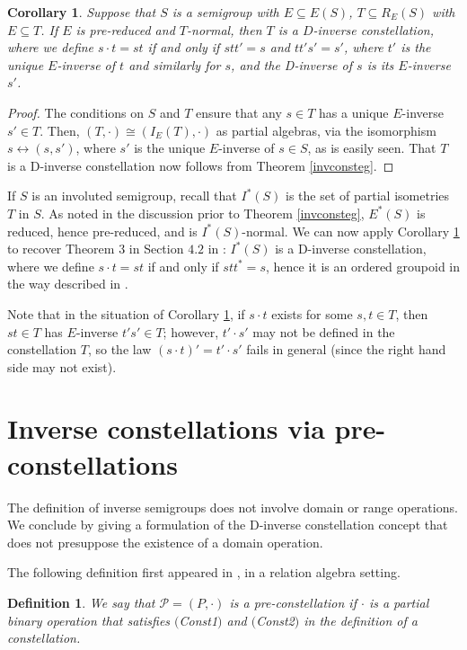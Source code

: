 \documentclass[12pt]{amsart}
\newtheorem{cor}[thm]{Corollary}
\newtheorem{dfn}[thm]{Definition}
\theoremstyle{definition}
\newcommand{\Pcon}{\mathcal P}
\begin{document}
\begin{cor}  \label{Tnorm}
Suppose that $S$ is a semigroup with $E\subseteq E(S)$, $T\subseteq R_E(S)$ with $E\subseteq T$.
If $E$ is pre-reduced and $T$-normal, then $T$ is a $D$-inverse constellation, where we define $s\cdot t=st$ if and only if $stt'=s$ and $tt's'=s'$, where $t'$ is the unique $E$-inverse of $t$ and similarly for $s$, and the D-inverse of $s$ is its $E$-inverse $s'$.
\end{cor}
\begin{proof}
The conditions on $S$ and $T$ ensure that any $s\in T$ has a unique $E$-inverse $s'\in T$.  Then, $(T,\cdot)\cong (I_E(T),\cdot)$ as partial algebras, via the isomorphism $s\leftrightarrow (s,s')$, where $s'$ is the unique $E$-inverse of $s\in S$, as is easily seen.  That $T$ is a D-inverse constellation now follows from Theorem \ref{invconsteg}.
\end{proof}

If $S$ is an involuted semigroup, recall that $I^*(S)$ is the set of partial isometries $T$ in $S$.  As noted in the discussion prior to Theorem \ref{invconsteg}, $E^*(S)$ is reduced, hence pre-reduced, and is $I^*(S)$-normal.  We can now apply Corollary \ref{Tnorm} to recover Theorem 3 in Section $4.2$ in \cite{lawsoninverse}: $I^*(S)$ is a D-inverse constellation, where we define $s\cdot t=st$ if and only if $stt^*=s$, hence it is an ordered groupoid in the way described in \cite{lawsoninverse}.  

Note that in the situation of Corollary \ref{Tnorm}, if $s\cdot t$ exists for some $s,t\in T$, then $st\in T$ has $E$-inverse $t's'\in T$; however, $t'\cdot s'$ may not be defined in the constellation $T$, so the law $(s\cdot t)'=t'\cdot s'$ fails in general (since the right hand side may not exist).


\section{Inverse constellations via pre-constellations}  \label{sec:pre}

The definition of inverse semigroups does not involve domain or range operations.  We conclude by giving a formulation of the D-inverse constellation concept that does not presuppose the existence of a domain operation.  

The following definition first appeared in \cite{demonic}, in a relation algebra setting.

\begin{dfn}
We say that $\Pcon=(P,\cdot)$ is a {\em pre-constellation} if $\cdot$ is a partial binary operation that satisfies $($Const1$)$ and $($Const2$)$ in the definition of a constellation.
\end{dfn}
\end{document}
